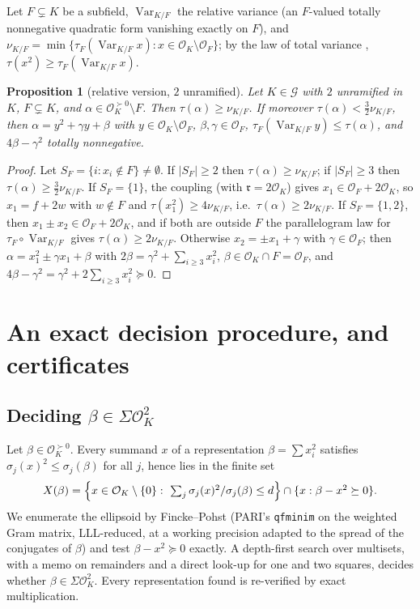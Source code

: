\documentclass[11pt,reqno]{amsart}
\theoremstyle{plain}
\newtheorem{proposition}[theorem]{Proposition}
\theoremstyle{definition}
\newcommand{\OK}{\mathcal{O}_K}
\newcommand{\OF}{\mathcal{O}_F}
\newcommand{\rr}{\mathfrak{r}}
\newcommand{\Gcl}{\mathcal{G}}
\newcommand{\SoS}{\Sigma\OK^{2}}
\newcommand{\tp}{\succ 0}
\DeclareMathOperator{\Var}{Var}
\begin{document}
Let $F\subsetneq K$ be a subfield, $\Var_{K/F}$ the relative variance (an $F$-valued totally
nonnegative quadratic form vanishing exactly on $F$), and
$\nu_{K/F}=\min\{\tau_F(\Var_{K/F}x):x\in\OK\setminus\OF\}$; by the law of total variance
\cite[ANOVA identity]{PB}, $\tau(x^{2})\ge\tau_F(\Var_{K/F}x)$.

\begin{proposition}[relative version, $2$ unramified]\label{prop:rel}
Let $K\in\Gcl$ with $2$ unramified in $K$, $F\subsetneq K$, and $\alpha\in\OK^{\tp}\setminus F$.
Then $\tau(\alpha)\ge\nu_{K/F}$. If moreover $\tau(\alpha)<\frac32\nu_{K/F}$, then
$\alpha=y^{2}+\gamma y+\beta$ with $y\in\OK\setminus\OF$, $\beta,\gamma\in\OF$,
$\tau_F(\Var_{K/F}y)\le\tau(\alpha)$, and $4\beta-\gamma^{2}$ totally nonnegative.
\end{proposition}

\begin{proof}
Let $S_F=\{i:x_i\notin F\}\ne\emptyset$. If $|S_F|\ge2$ then $\tau(\alpha)\ge\nu_{K/F}$; if
$|S_F|\ge3$ then $\tau(\alpha)\ge\frac32\nu_{K/F}$. If $S_F=\{1\}$, the coupling (with $\rr=2\OK$)
gives $x_1\in\OF+2\OK$, so $x_1=f+2w$ with $w\notin F$ and $\tau(x_1^{2})\ge4\nu_{K/F}$, i.e.\
$\tau(\alpha)\ge2\nu_{K/F}$. If $S_F=\{1,2\}$, then $x_1\pm x_2\in\OF+2\OK$, and if both are
outside $F$ the parallelogram law for $\tau_F\circ\Var_{K/F}$ gives $\tau(\alpha)\ge2\nu_{K/F}$.
Otherwise $x_2=\pm x_1+\gamma$ with $\gamma\in\OF$; then
$\alpha=x_1^{2}\pm\gamma x_1+\beta$ with $2\beta=\gamma^{2}+\sum_{i\ge3}x_i^{2}$, $\beta\in\OK\cap F=\OF$,
and $4\beta-\gamma^{2}=\gamma^{2}+2\sum_{i\ge3}x_i^{2}\succeq0$.
\end{proof}

\section{An exact decision procedure, and certificates}\label{sec:algo}

\subsection{Deciding $\beta\in\SoS$}
Let $\beta\in\OK^{\tp}$. Every summand $x$ of a representation $\beta=\sum x_i^{2}$ satisfies
$\sigma_j(x)^{2}\le\sigma_j(\beta)$ for all $j$, hence lies in the finite set
\[
 X(\beta)=\Bigl\{x\in\OK\setminus\{0\}:\ \textstyle\sum_j\sigma_j(x)^{2}/\sigma_j(\beta)\le d\Bigr\}
 \cap\{x:\beta-x^{2}\succeq0\}.
\]
We enumerate the ellipsoid by Fincke--Pohst (PARI's \texttt{qfminim} on the weighted Gram matrix,
LLL-reduced, at a working precision adapted to the spread of the conjugates of $\beta$) and test
$\beta-x^{2}\succeq0$ exactly. A depth-first search over multisets, with a memo on remainders and a
direct look-up for one and two squares, decides whether $\beta\in\SoS$. Every representation found
is re-verified by exact multiplication.
\end{document}
